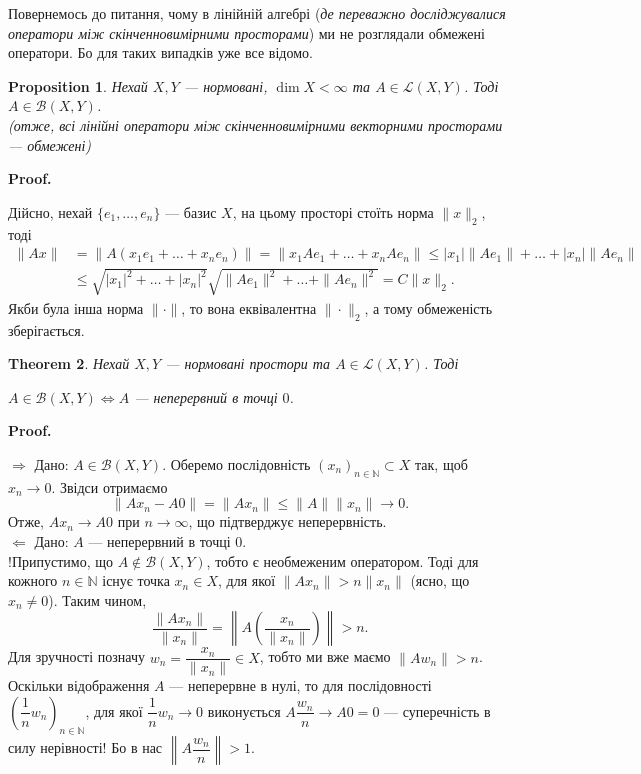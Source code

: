 \documentclass[a4paper, 10pt]{article}
\makeatletter
\def\rightproof{$\boxed{\Rightarrow}$ }
\def\leftproof{$\boxed{\Leftarrow}$ }
\theoremstyle{theoremdd}
\newtheorem{theorem}{Theorem}[subsection]
\theoremstyle{theoremdd}
\theoremstyle{theoremdd}
\theoremstyle{theoremdd}
\theoremstyle{theoremdd}
\newtheorem{proposition}[theorem]{Proposition}
\theoremstyle{theoremdd}
\theoremstyle{theoremdd}
\theoremstyle{theoremdd}
\renewenvironment{proof}[1][Proof.\\]{\par
\pushQED{\hfill \qed}%
\normalfont \topsep6\p@\@plus6\p@\relax
\trivlist
\item\relax
{\bfseries
#1\@addpunct{.}}\hspace\labelsep\ignorespaces
}{%
\popQED\endtrivlist\@endpefalse
}
\makeatother
\begin{document}
\noindent
Повернемось до питання, чому в лінійній алгебрі (\textit{де переважно досліджувалися оператори між скінченновимірними просторами}) ми не розглядали обмежені оператори. Бо для таких випадків уже все відомо.

\begin{proposition}
Нехай $X,Y$ --- нормовані, $\dim X \!<\! \infty$ та $A \in \mathcal{L}(X,Y)$. Тоді $A \in \mathcal{B}(X,Y)$.\\
(\textit{отже, всі лінійні оператори між скінченновимірними векторними просторами --- обмежені})
\end{proposition}

\begin{proof}
Дійсно, нехай $\{e_1,\dots,e_n\}$ --- базис $X$, на цьому просторі стоїть норма $\|x\|_2$, тоді
\begin{align*}
\|Ax\| & = \|A (x_1 e_1 + \dots + x_n e_n) \| = \| x_1 A e_1 + \dots + x_n A e_n \| \leq |x_1| \|A e_1 \| + \dots + |x_n| \|A e_n \| \\
& \leq \sqrt{|x_1|^2 + \dots + |x_n|^2} \sqrt{\|Ae_1\|^2 + \dots + \|Ae_n\|^2} = C \|x\|_2.
\end{align*}
Якби була інша норма $\| \cdot \|$, то вона еквівалентна $\| \cdot \|_2$, а тому обмеженість зберігається.
\end{proof}

\begin{theorem}
Нехай $X,Y$ --- нормовані простори та $A \in \mathcal{L}(X,Y)$. Тоді
\begin{center}
$A \in \mathcal{B}(X,Y) \iff A $ --- неперервний в точці $0$.
\end{center}
\end{theorem}

\begin{proof}
\rightproof Дано: $A \in \mathcal{B}(X,Y)$. Оберемо послідовність $(x_n)_{n \in \mathbb{N}} \subset X$ так, щоб $x_n \to 0$. Звідси отримаємо 
\[
\|Ax_n - A0\| = \|Ax_n\| \leq \|A\| \|x_n\| \to 0.
\]
Отже, $Ax_n \to A0$ при $n \to \infty$, що підтверджує неперервність. 
\bigskip \\
\leftproof Дано: $A$ --- неперервний в точці $0$.\\
!Припустимо, що $A \notin \mathcal{B}(X,Y)$, тобто є необмеженим оператором. Тоді для кожного $n \in \mathbb{N}$ існує точка $x_n \in X$, для якої $\|Ax_n\| > n \|x_n\|$ (ясно, що $x_n \neq 0$).  Таким чином, 
\[
\dfrac{\|Ax_n\|}{\|x_n\|} = \left\| A\left( \dfrac{x_n}{\|x_n\|} \right) \right\| > n.
\]
Для зручності позначу $w_n = \dfrac{x_n}{\|x_n\|} \in X$, тобто ми вже маємо $\| Aw_n\| > n$. Оскільки відображення $A$ --- неперервне в нулі, то для послідовності $\left( \dfrac{1}{n}w_n \right)_{n \in \mathbb{N}}$, для якої $\dfrac{1}{n} w_n \to 0$ виконується $A \dfrac{w_n}{n} \to A0 = 0$ --- суперечність в силу нерівності! Бо в нас $\left\| A \dfrac{w_n}{n} \right\| > 1$.
\end{proof}
\end{document}
